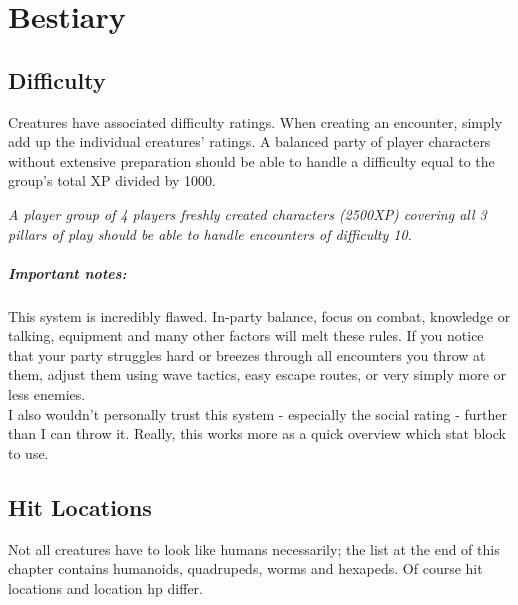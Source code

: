 \documentclass[12pt,a4paper,openany,usenames,dvipsnames]{book}
\begin{document}
	\chapter{Bestiary}
	\section{Difficulty}
	Creatures have associated difficulty ratings. When creating an encounter, simply add up the individual creatures' ratings. A balanced party of player characters without extensive preparation should be able to handle a difficulty equal to the group's total XP divided by 1000.
	\begin{exampleblock}
		\itshape A player group of 4 players freshly created characters (2500XP) covering all 3 pillars of play should be able to handle encounters of difficulty 10.
	\end{exampleblock}
	\paragraph{Important notes:}
	This system is incredibly flawed. In-party balance, focus on combat, knowledge or talking, equipment and many other factors will melt these rules. If you notice that your party struggles hard or breezes through all encounters you throw at them, adjust them using wave tactics, easy escape routes, or very simply more or less enemies.\\
	I also wouldn't personally trust this system - especially the social rating - further than I can throw it. Really, this works more as a quick overview which stat block to use.
	
	\section{Hit Locations}
	Not all creatures have to look like humans necessarily; the list at the end of this chapter contains humanoids, quadrupeds, worms and hexapeds. Of course hit locations and location hp differ.
	
\end{document}
